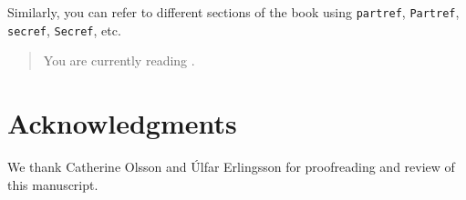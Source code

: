 Similarly, you can refer to different sections of the book using
{\tt partref}, {\tt Partref}, {\tt secref}, {\tt Secref}, etc.

\begin{quote}
	You are currently reading .
\end{quote}

\section*{Acknowledgments}
We thank Catherine Olsson and \'Ulfar Erlingsson for proofreading and
review of this manuscript.


\clearpage
